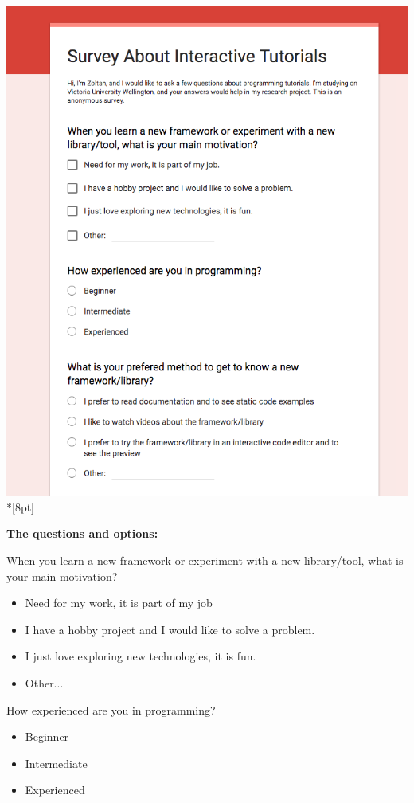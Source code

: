 \documentclass[12pt, a4paper, oneside, openright, medskipamount]{report}
\begin{document}
\includegraphics[width=1\textwidth]{assets/survey-screenshot.png}\\*[8pt]

\textbf{The questions and options:}

\noindent When you learn a new framework or experiment with a new library/tool, what is your main motivation?
\begin{itemize}[noitemsep]
\item Need for my work, it is part of my job
\item I have a hobby project and I would like to solve a problem.
\item I just love exploring new technologies, it is fun.
\item Other...
\end{itemize}

\noindent How experienced are you in programming?
\begin{itemize}[noitemsep]
\item Beginner
\item Intermediate
\item Experienced
\end{itemize}
\end{document}
